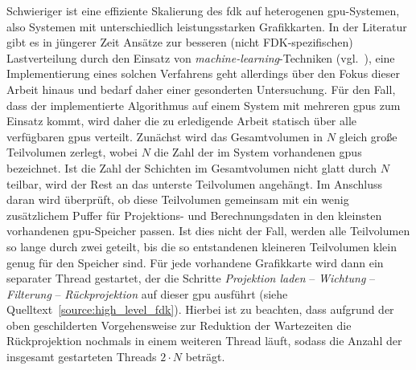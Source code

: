 Schwieriger ist eine effiziente Skalierung des \gls{fdk} auf heterogenen \gls{gpu}-Systemen, also Systemen mit
unterschiedlich leistungsstarken Grafikkarten. In der Literatur gibt es in jüngerer Zeit Ansätze zur besseren
(nicht FDK-spezifischen) Lastverteilung durch den Einsatz von \textit{machine-learning}-Techniken (vgl.~\cite{linhsi}),
eine Implementierung eines solchen Verfahrens geht allerdings über den Fokus dieser Arbeit hinaus und bedarf daher einer
gesonderten Untersuchung. Für den Fall, dass der implementierte Algorithmus auf einem System mit mehreren \gls{gpu}s zum
Einsatz kommt, wird daher die zu erledigende Arbeit statisch über alle verfügbaren \gls{gpu}s verteilt. Zunächst wird
das Gesamtvolumen in $N$ gleich große Teilvolumen zerlegt, wobei $N$ die Zahl der im System vorhandenen \gls{gpu}s
bezeichnet. Ist die Zahl der Schichten im Gesamtvolumen nicht glatt durch $N$ teilbar, wird der Rest an das unterste
Teilvolumen angehängt. Im Anschluss daran wird überprüft, ob diese Teilvolumen gemeinsam mit ein wenig zusätzlichem
Puffer für Projektions- und Berechnungsdaten in den kleinsten vorhandenen \gls{gpu}-Speicher passen. Ist dies nicht der
Fall, werden alle Teilvolumen so lange durch zwei geteilt, bis die so entstandenen kleineren Teilvolumen klein genug für
den Speicher sind. Für jede vorhandene Grafikkarte wird dann ein separater Thread gestartet, der die Schritte
\textit{Projektion laden} -- \textit{Wichtung} -- \textit{Filterung} -- \textit{Rückprojektion} auf dieser \gls{gpu}
ausführt (siehe Quelltext~\ref{source:high_level_fdk}). Hierbei ist zu beachten, dass aufgrund der oben geschilderten
Vorgehensweise zur Reduktion der Wartezeiten die Rückprojektion nochmals in einem weiteren Thread läuft, sodass die
Anzahl der insgesamt gestarteten Threads $2 \cdot N$ beträgt.

